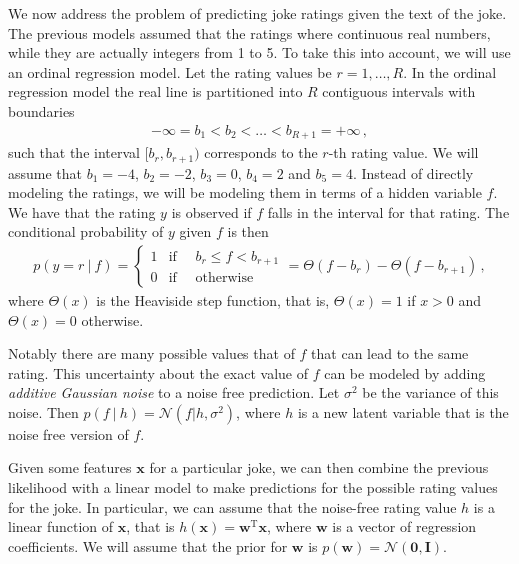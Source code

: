 \documentclass[10pt]{harvardml}
\theoremstyle{plain}
\begin{document}
We now address the problem of predicting joke ratings given the text of the
joke. The previous models assumed that the ratings where continuous real
numbers, while they are actually integers from 1 to 5. To take this into
account, we will use an ordinal regression model.
Let the rating values
be $r = 1,\ldots,R$. In the ordinal regression model the real line is
partitioned into $R$ contiguous intervals with boundaries
\begin{align}
-\infty = b_1 < b_2 < \ldots < b_{R+1} = +\infty\,,
\end{align}
such that the interval $[b_r,b_{r+1})$ corresponds to the $r$-th rating value.
We will assume that $b_1 = -4$, $b_2 = -2$, $b_3 = 0$, $b_4 = 2$ and $b_5 = 4$.
Instead of directly modeling the ratings, we will be modeling them in terms of a
hidden variable $f$. We have that the rating $y$ is observed
if $f$ falls in the interval for that rating. The conditional probability of
$y$ given $f$ is then
\begin{align}
p(y = r\ |\ f) =
\left\{
    \begin{array}{ll}
        1  & \mbox{if }\quad  b_r \leq f < b_{r+1} \\
        0 & \mbox{if } \quad \mbox{otherwise}
    \end{array}
\right.
= \Theta(f - b_r) - \Theta(f-b_{r+1})\,,
\end{align}
where $\Theta(x)$ is the Heaviside step function, that is, $\Theta(x)=1$ if
$x>0$ and $\Theta(x)=0$ otherwise.


Notably there are many possible values that of $f$ that can lead to
the same rating.  This uncertainty about the exact value of $f$ can be
modeled by adding \textit{additive Gaussian noise} to a noise free
prediction. Let $\sigma^2$ be the variance of this noise. Then
$p(f\ |\ h) = \mathcal{N}(f|h,\sigma^2)$, where $h$ is a new latent
variable that is the noise free version of $f$.

Given some features $\mathbf{x}$ for a particular joke, we can then combine the
previous likelihood with a linear model to make predictions for the possible
rating values for the joke. In particular, we can assume that the noise-free
rating value $h$ is a linear function of $\mathbf{x}$, that is
$h(\mathbf{x})=\mathbf{w}^\text{T} \mathbf{x}$, where $\mathbf{w}$ is a vector
of regression coefficients. We will assume that the prior for $\mathbf{w}$ is
$p(\mathbf{w})=\mathcal{N}(\bm 0, \mathbf{I})$.
\end{document}
